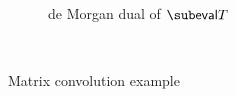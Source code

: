 \begin{figure}
\begin{subfigure}{0.46\textwidth}
      \vspace{2mm}
      \caption{de Morgan dual of $\GC{eval}{T}$}
   \end{subfigure}\\
   \vspace{5mm}
   \begin{subfigure}[t]{3.3in}
      \small
      
   \end{subfigure}
   \begin{subfigure}[t]{2.1in}
      \small
      
   \end{subfigure}
   \caption{Matrix convolution example}
\end{figure}

